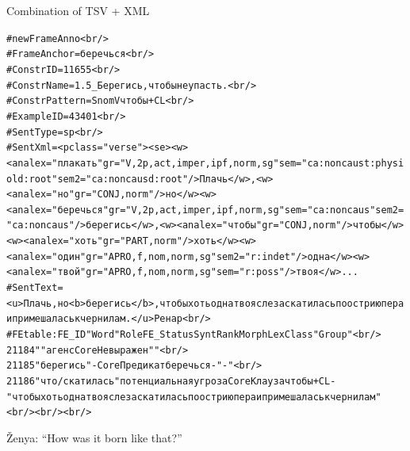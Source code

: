 \documentclass[10pt, compress]{beamer}
\begin{document}
\begin{frame}

Combination of TSV + XML

\begin{tiny}
\begin{alltt}
\# new FrameAnno<br />\\
\# FrameAnchor = беречься<br />\\
\# ConstrID = 11655<br />\\
\# ConstrName = 1.5\_Берегись, чтобы не упасть.<br />\\
\# ConstrPattern = Snom V чтобы + CL<br />\\
\# ExampleID = 43401<br />\\
\# SentType = sp<br />\\
\# SentXml =     <p class="verse"><se><w><ana lex="плакать" gr="V,2p,act,imper,ipf,norm,sg" sem="ca:noncaus t:physiol d:root" sem2="ca:noncaus d:root"/>Плачь</w>, <w><ana lex="но" gr="CONJ,norm"/>но</w> <w><ana lex="беречься" gr="V,2p,act,imper,ipf,norm,sg" sem="ca:noncaus" sem2="ca:noncaus"/>берегись</w>, <w><ana lex="чтобы" gr="CONJ,norm"/>чтобы</w> <w><ana lex="хоть" gr="PART,norm"/>хоть</w> <w><ana lex="один" gr="APRO,f,nom,norm,sg" sem2="r:indet"/>одна</w> <w><ana lex="твой" gr="APRO,f,nom,norm,sg" sem="r:poss"/>твоя</w> ... \\
\# SentText =  <u>Плачь, но <b>берегись</b>, чтобы хоть одна твоя слеза скатилась по острию пера и примешалась к чернилам. </u>Ренар <br />\\
\# FEtable:FE\_ID	"Word"	Role	FE\_Status	SyntRank	Morph	LexClass	"Group"<br />\\
21184	""	агенс	Core	Не выражен			""<br />\\
21185	"берегись"	-	Core	Предикат	беречься	-	"-"<br />\\
21186	"что / скатилась"	потенциальная угроза	Core	Клауза	чтобы + CL	-	"чтобы хоть одна твоя слеза скатилась по острию пера и примешалась к чернилам"<br /><br /><br />\\
\end{alltt}
\end{tiny}


Ženya: ``How was it born like that?'' 

\end{frame}
\end{document}
